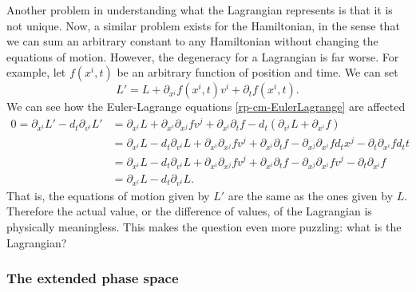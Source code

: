 Another problem in understanding what the Lagrangian represents is that it is not unique. Now, a similar problem exists for the Hamiltonian, in the sense that we can sum an arbitrary constant to any Hamiltonian without changing the equations of motion. However, the degeneracy for a Lagrangian is far worse. For example, let $f(x^i,t)$ be an arbitrary function of position and time. We can set
\begin{equation}\label{rp-cm-LagrangianGaugeChange}
	L' = L + \partial_{x^i} f(x^i, t) v^i + \partial_t f(x^i, t).
\end{equation}
We can see how the Euler-Lagrange equations \ref{rp-cm-EulerLagrange} are affected
\begin{equation}
	\begin{aligned}
		0 =\partial_{x^i}L' - d_t \partial_{v^i} L' &= \partial_{x^i} L + \partial_{x^i} \partial_{x^j} f v^j + \partial_{x^i} \partial_t f - d_t \left( \partial_{v^i} L + \partial_{x^i} f \right) \\
		&= \partial_{x^i} L - d_t \partial_{v^i} L + \partial_{x^i} \partial_{x^j} f v^j + \partial_{x^i} \partial_t f - \partial_{x^j}\partial_{x^i} f d_t x^j - \partial_t \partial_{x^i} f d_t t \\
		&= \partial_{x^i} L - d_t \partial_{v^i} L + \partial_{x^i} \partial_{x^j} f v^j + \partial_{x^i} \partial_t f - \partial_{x^j}\partial_{x^i} f v^j - \partial_t \partial_{x^i} f \\
		&= \partial_{x^i} L - d_t \partial_{v^i} L.
	\end{aligned}
\end{equation}
That is, the equations of motion given by $L'$ are the same as the ones given by $L$. Therefore the actual value, or the difference of values, of the Lagrangian is physically meaningless. This makes the question even more puzzling: what is the Lagrangian?

\subsubsection{The extended phase space}

